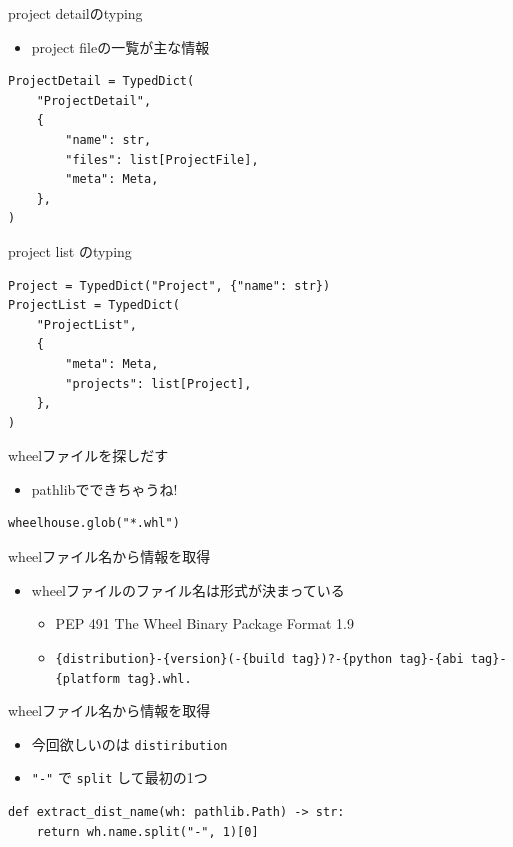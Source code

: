 \documentclass[presentation]{beamer}
\begin{document}
\begin{frame}[label={sec:org7cb014b},fragile]{project detailのtyping}
 \begin{itemize}
\item project fileの一覧が主な情報
\end{itemize}

\begin{verbatim}
ProjectDetail = TypedDict(
    "ProjectDetail",
    {
        "name": str,
        "files": list[ProjectFile],
        "meta": Meta,
    },
)

\end{verbatim}
\end{frame}

\begin{frame}[label={sec:orgb84414c},fragile]{project list のtyping}
 \begin{verbatim}
Project = TypedDict("Project", {"name": str})
ProjectList = TypedDict(
    "ProjectList",
    {
        "meta": Meta,
        "projects": list[Project],
    },
)

\end{verbatim}
\end{frame}

\begin{frame}[label={sec:org4f72148},fragile]{wheelファイルを探しだす}
 \begin{itemize}
\item pathlibでできちゃうね!
\end{itemize}

\begin{verbatim}
wheelhouse.glob("*.whl")
\end{verbatim}
\end{frame}

\begin{frame}[label={sec:org1f98f27},fragile]{wheelファイル名から情報を取得}
 \begin{itemize}
\item wheelファイルのファイル名は形式が決まっている
\begin{itemize}
\item PEP 491 The Wheel Binary Package Format 1.9
\item \texttt{\{distribution\}-\{version\}(-\{build tag\})?-\{python tag\}-\{abi tag\}-\{platform tag\}.whl.}
\end{itemize}
\end{itemize}
\end{frame}

\begin{frame}[label={sec:org5baf81e},fragile]{wheelファイル名から情報を取得}
 \begin{itemize}
\item 今回欲しいのは \texttt{distiribution}
\item \texttt{"-"} で \texttt{split} して最初の1つ
\end{itemize}

\begin{verbatim}
def extract_dist_name(wh: pathlib.Path) -> str:
    return wh.name.split("-", 1)[0]
\end{verbatim}
\end{frame}
\end{document}
